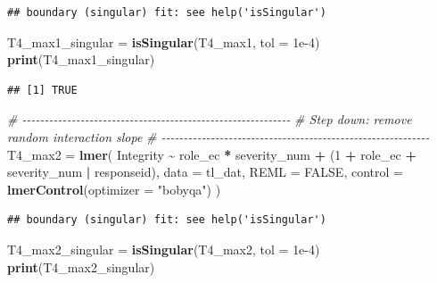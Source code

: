 \documentclass[
]{article}
\newenvironment{Shaded}{\begin{snugshade}}{\end{snugshade}}
\newcommand{\AttributeTok}[1]{\textcolor[rgb]{0.13,0.29,0.53}{#1}}
\newcommand{\CommentTok}[1]{\textcolor[rgb]{0.56,0.35,0.01}{\textit{#1}}}
\newcommand{\ConstantTok}[1]{\textcolor[rgb]{0.56,0.35,0.01}{#1}}
\newcommand{\DecValTok}[1]{\textcolor[rgb]{0.00,0.00,0.81}{#1}}
\newcommand{\FloatTok}[1]{\textcolor[rgb]{0.00,0.00,0.81}{#1}}
\newcommand{\FunctionTok}[1]{\textcolor[rgb]{0.13,0.29,0.53}{\textbf{#1}}}
\newcommand{\NormalTok}[1]{#1}
\newcommand{\OtherTok}[1]{\textcolor[rgb]{0.56,0.35,0.01}{#1}}
\newcommand{\SpecialCharTok}[1]{\textcolor[rgb]{0.81,0.36,0.00}{\textbf{#1}}}
\newcommand{\StringTok}[1]{\textcolor[rgb]{0.31,0.60,0.02}{#1}}
\begin{document}
\begin{verbatim}
## boundary (singular) fit: see help('isSingular')
\end{verbatim}

\begin{Shaded}
\begin{Highlighting}[]
\NormalTok{T4\_max1\_singular }\OtherTok{=} \FunctionTok{isSingular}\NormalTok{(T4\_max1, }\AttributeTok{tol =} \FloatTok{1e{-}4}\NormalTok{)}
\FunctionTok{print}\NormalTok{(T4\_max1\_singular)}
\end{Highlighting}
\end{Shaded}

\begin{verbatim}
## [1] TRUE
\end{verbatim}

\begin{Shaded}
\begin{Highlighting}[]
\CommentTok{\# {-}{-}{-}{-}{-}{-}{-}{-}{-}{-}{-}{-}{-}{-}{-}{-}{-}{-}{-}{-}{-}{-}{-}{-}{-}{-}{-}{-}{-}{-}{-}{-}{-}{-}{-}{-}{-}{-}{-}{-}{-}{-}{-}{-}{-}{-}{-}{-}{-}{-}{-}{-}{-}{-}{-}{-}{-}{-}{-}{-}}
\CommentTok{\# Step down: remove random interaction slope}
\CommentTok{\# {-}{-}{-}{-}{-}{-}{-}{-}{-}{-}{-}{-}{-}{-}{-}{-}{-}{-}{-}{-}{-}{-}{-}{-}{-}{-}{-}{-}{-}{-}{-}{-}{-}{-}{-}{-}{-}{-}{-}{-}{-}{-}{-}{-}{-}{-}{-}{-}{-}{-}{-}{-}{-}{-}{-}{-}{-}{-}{-}{-}}
\NormalTok{T4\_max2 }\OtherTok{=} \FunctionTok{lmer}\NormalTok{(}
\NormalTok{  Integrity }\SpecialCharTok{\textasciitilde{}}\NormalTok{ role\_ec }\SpecialCharTok{*}\NormalTok{ severity\_num }\SpecialCharTok{+}
\NormalTok{    (}\DecValTok{1} \SpecialCharTok{+}\NormalTok{ role\_ec }\SpecialCharTok{+}\NormalTok{ severity\_num }\SpecialCharTok{|}\NormalTok{ responseid),}
  \AttributeTok{data =}\NormalTok{ tl\_dat,}
  \AttributeTok{REML =} \ConstantTok{FALSE}\NormalTok{,}
  \AttributeTok{control =} \FunctionTok{lmerControl}\NormalTok{(}\AttributeTok{optimizer =} \StringTok{"bobyqa"}\NormalTok{)}
\NormalTok{)}
\end{Highlighting}
\end{Shaded}

\begin{verbatim}
## boundary (singular) fit: see help('isSingular')
\end{verbatim}

\begin{Shaded}
\begin{Highlighting}[]
\NormalTok{T4\_max2\_singular }\OtherTok{=} \FunctionTok{isSingular}\NormalTok{(T4\_max2, }\AttributeTok{tol =} \FloatTok{1e{-}4}\NormalTok{)}
\FunctionTok{print}\NormalTok{(T4\_max2\_singular)}
\end{Highlighting}
\end{Shaded}
\end{document}
